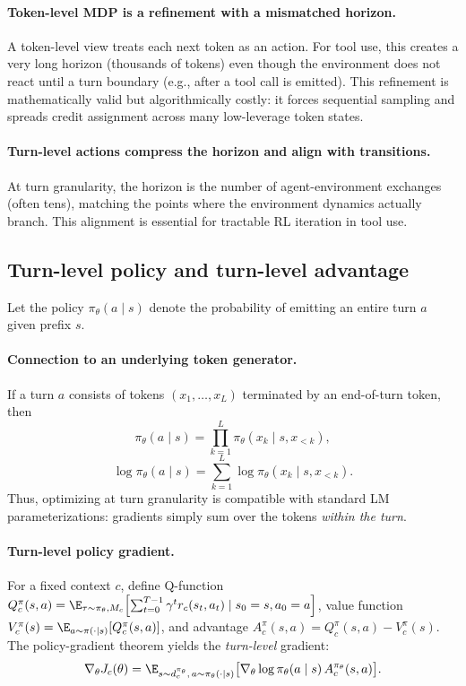 \paragraph{Token-level MDP is a refinement with a mismatched horizon.}
A token-level view treats each next token as an action.
For tool use, this creates a very long horizon (thousands of tokens) even though the environment does not react until a turn boundary (e.g., after a tool call is emitted).
This refinement is mathematically valid but algorithmically costly: it forces sequential sampling and spreads credit assignment across many low-leverage token states.

\paragraph{Turn-level actions compress the horizon and align with transitions.}
At turn granularity, the horizon is the number of agent-environment exchanges (often tens), matching the points where the environment dynamics actually branch.
This alignment is essential for tractable RL iteration in tool use.

\subsection{Turn-level policy and turn-level advantage}

Let the policy $\pi_\theta(a\mid s)$ denote the probability of emitting an entire turn $a$ given prefix $s$.

\paragraph{Connection to an underlying token generator.}
If a turn $a$ consists of tokens $(x_1,\dots,x_L)$ terminated by an end-of-turn token, then
\begin{equation}
\label{eq:turn_prob}
\pi_\theta(a\mid s)
=
\prod_{k=1}^{L} \pi_\theta(x_k \mid s, x_{<k}), 
\end{equation}
\begin{equation}
\log \pi_\theta(a\mid s) = \sum_{k=1}^{L} \log \pi_\theta(x_k \mid s, x_{<k}).
\end{equation}
Thus, optimizing at turn granularity is compatible with standard LM parameterizations: gradients simply sum over the tokens \emph{within the turn}.

\paragraph{Turn-level policy gradient.}
For a fixed context $c$, define Q-function
$Q_c^\pi(s,a) = 
\E_{\tau\sim\pi_\theta, M_c}\!\left[\sum_{t=0}^{T-1}\gamma^t r_c(s_t,a_t)\mid s_0 = s, a_0 = a\right]$, value function $V_c^\pi(s)=\E_{a\sim\pi(\cdot\mid s)}[Q_c^\pi(s,a)]$,
and advantage $A_c^\pi(s,a)=Q_c^\pi(s,a)-V_c^\pi(s)$.
The policy-gradient theorem yields the \emph{turn-level} gradient:
\begin{equation}
\label{eq:pg_turn}
\nabla_\theta J_c(\theta)
=
\E_{s\sim d_c^{\pi_\theta},\,a\sim\pi_\theta(\cdot\mid s)}
\big[\nabla_\theta \log \pi_\theta(a\mid s)\, A_c^{\pi_\theta}(s,a)\big].
\end{equation}

